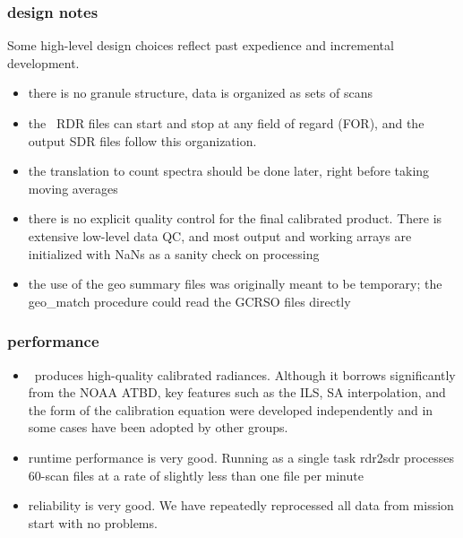 \documentclass[11pt]{beamer}
\begin{document}
\begin{frame}
\frametitle{design notes}

Some high-level design choices reflect past expedience and
incremental development.

\begin{itemize}
  \item there is no granule structure, data is organized as
    sets of scans

  \item the \noaa\ RDR files can start and stop at any field of
    regard (FOR), and the output SDR files follow this organization.

  \item the translation to count spectra should be done later, right
    before taking moving averages

  \item there is no explicit quality control for the final
    calibrated product.  There is extensive low-level data QC, and
    most output and working arrays are initialized with NaNs as a
    sanity check on processing

  \item the use of the geo summary files was originally meant to be
    temporary; the geo\_match procedure could read the GCRSO files
    directly

\end{itemize}

\end{frame}
\begin{frame}
\frametitle{performance}

\begin{itemize} 
  \item \ccast\ produces high-quality calibrated radiances.
    Although it borrows significantly from the NOAA ATBD, key
    features such as the ILS, SA interpolation, and the form of the
    calibration equation were developed independently and in some
    cases have been adopted by other groups.

  \item runtime performance is very good.  Running as a single task
    rdr2sdr processes 60-scan files at a rate of slightly less than
    one file per minute

  \item reliability is very good.  We have repeatedly reprocessed
    all data from mission start with no problems.

\end{itemize} 

\end{frame}
\end{document}
